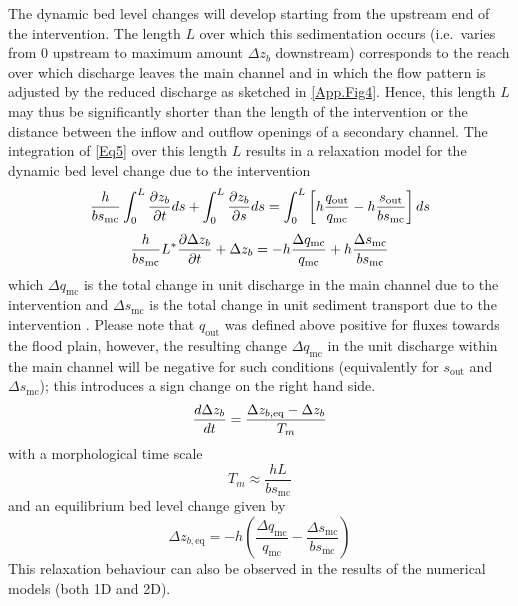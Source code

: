 The dynamic bed level changes will develop starting from the upstream end of the intervention.
The length $L$ over which this sedimentation occurs (i.e.~varies from 0 upstream to maximum amount $\Delta z_b$ downstream) corresponds to the reach over which discharge leaves the main channel and in which the flow pattern is adjusted by the reduced discharge as sketched in \autoref{App.Fig4}.
Hence, this length $L$ may thus be significantly shorter than the length of the intervention or the distance between the inflow and outflow openings of a secondary channel.
The integration of \autoref{Eq5} over this length $L$ results in a relaxation model for the dynamic bed level change due to the intervention
%
\begin{equation}
\frac{h}{b s_\text{mc}} \int_0^L \pdiff{z_b}{t} ds + \int_0^L \pdiff{z_b}{s} ds = \int_0^L \left [ h \frac{q_\text{out}}{q_\text{mc}} - h \frac{s_\text{out}}{b s_\text{mc}} \right ] ds
\label{Eq5a}
\end{equation}
%
\begin{equation}
\frac{h}{b s_\text{mc}} L^* \pdiff{\Delta z_b}{t} + \Delta z_b = - h \frac{\Delta q_\text{mc}}{q_\text{mc}} + h \frac{\Delta s_\text{mc}}{b s_\text{mc}}
\label{Eq5b}
\end{equation}
%
which $\Delta q_\text{mc}$ is the total change in unit discharge in the main channel due to the intervention  and $\Delta s_\text{mc}$ is the total change in unit sediment transport due to the intervention .
Please note that $q_\text{out}$ was defined above positive for fluxes towards the flood plain, however, the resulting change $\Delta q_\text{mc}$ in the unit discharge within the main channel will be negative for such conditions (equivalently for $s_\text{out}$ and $\Delta s_\text{mc}$); this introduces a sign change on the right hand side.
%
\begin{equation}
\diff{\Delta z_b}{t} = \frac{\Delta z_{b,\text{eq}} - \Delta z_b}{T_m}
\label{Eq5dif}
\end{equation}
%
with a morphological time scale 
%
\begin{equation}
T_m \approx \frac{h L}{b s_\text{mc}}
\label{Eq5T}
\end{equation}
%
and an equilibrium bed level change  given by
%
\begin{equation}
\Delta z_{b,\text{eq}} = -h \left ( \frac{\Delta q_\text{mc}}{q_\text{mc}} - \frac{\Delta s_\text{mc}}{b s_\text{mc}} \right )
\label{Eq6}
\end{equation}
%
This relaxation behaviour can also be observed in the results of the numerical models (both 1D and 2D).

